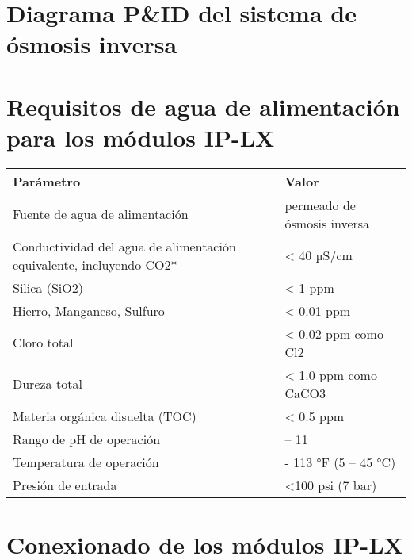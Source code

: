 
\begin{appendixs}
    \fontsize{10}{12}\selectfont
    \vspace{-2cm} 
    \section{Diagrama P\&ID del sistema de ósmosis inversa}\label{sec:anexoA}
    \section{Requisitos de agua de alimentación para los módulos IP-LX}\label{sec:anexoB}
    \renewcommand{\arraystretch}{1} %
    \begin{longtable}{|>{\raggedright\arraybackslash}m{8cm} |>{\raggedright\arraybackslash}m{8cm}|}
        \toprule
        \textbf{Parámetro}                                                  & \textbf{Valor}              \\
        \midrule
        Fuente de agua de alimentación                                      & permeado de ósmosis inversa \\
        \hline
        Conductividad del agua de alimentación equivalente, incluyendo CO2* & < 40 µS/cm                  \\
        \hline
        Silica (SiO2)                                                       & < 1 ppm                     \\
        \hline
        Hierro, Manganeso, Sulfuro                                          & < 0.01 ppm                  \\
        \hline
        Cloro total                                                         & < 0.02 ppm como Cl2         \\
        \hline
        Dureza total                                                        & < 1.0 ppm como CaCO3        \\
        \hline
        Materia orgánica disuelta (TOC)                                     & < 0.5 ppm                   \\
        \hline
        Rango de pH de operación                                            & 4 – 11                      \\
        \hline
        Temperatura de operación                                            & 41 - 113 °F (5 – 45 °C)     \\
        \hline
        Presión de entrada                                                  & <100 psi (7 bar)            \\
        \bottomrule
    \end{longtable}
    \section{Conexionado de los módulos IP-LX}\label{sec:anexoC}

\end{appendixs}